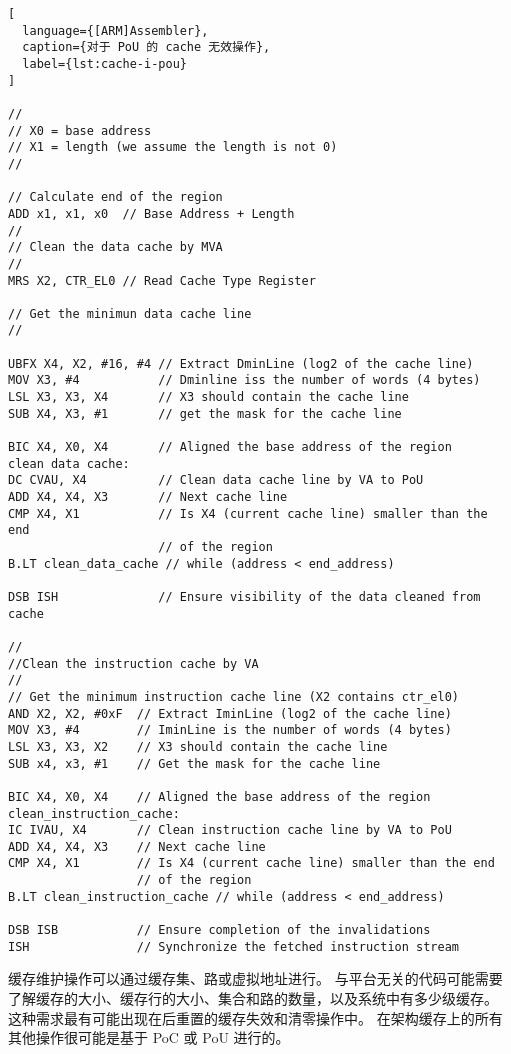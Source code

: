 \begin{lstlisting}[
  language={[ARM]Assembler},
  caption={对于 PoU 的 cache 无效操作},
  label={lst:cache-i-pou}
]

//
// X0 = base address
// X1 = length (we assume the length is not 0)
//

// Calculate end of the region
ADD x1, x1, x0  // Base Address + Length
//
// Clean the data cache by MVA
//
MRS X2, CTR_EL0 // Read Cache Type Register

// Get the minimun data cache line
//

UBFX X4, X2, #16, #4 // Extract DminLine (log2 of the cache line)
MOV X3, #4           // Dminline iss the number of words (4 bytes)
LSL X3, X3, X4       // X3 should contain the cache line
SUB X4, X3, #1       // get the mask for the cache line

BIC X4, X0, X4       // Aligned the base address of the region
clean data cache:
DC CVAU, X4          // Clean data cache line by VA to PoU
ADD X4, X4, X3       // Next cache line
CMP X4, X1           // Is X4 (current cache line) smaller than the end
                     // of the region
B.LT clean_data_cache // while (address < end_address)

DSB ISH              // Ensure visibility of the data cleaned from cache

//
//Clean the instruction cache by VA
//
// Get the minimum instruction cache line (X2 contains ctr_el0)
AND X2, X2, #0xF  // Extract IminLine (log2 of the cache line)
MOV X3, #4        // IminLine is the number of words (4 bytes)
LSL X3, X3, X2    // X3 should contain the cache line
SUB x4, x3, #1    // Get the mask for the cache line

BIC X4, X0, X4    // Aligned the base address of the region
clean_instruction_cache:
IC IVAU, X4       // Clean instruction cache line by VA to PoU
ADD X4, X4, X3    // Next cache line
CMP X4, X1        // Is X4 (current cache line) smaller than the end
                  // of the region
B.LT clean_instruction_cache // while (address < end_address)

DSB ISB           // Ensure completion of the invalidations
ISH               // Synchronize the fetched instruction stream
\end{lstlisting}


缓存维护操作可以通过缓存集、路或虚拟地址进行。
与平台无关的代码可能需要了解缓存的大小、缓存行的大小、集合和路的数量，以及系统中有多少级缓存。
这种需求最有可能出现在后重置的缓存失效和清零操作中。
在架构缓存上的所有其他操作很可能是基于 PoC 或 PoU 进行的。

